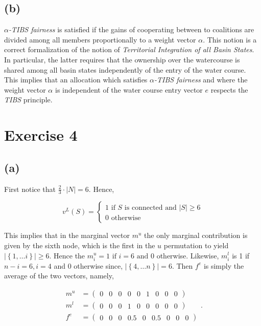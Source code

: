 \documentclass[american]{scrartcl}
\newcommand{\set}[1]{\left\{#1\right\}}
\newcommand{\abs}[1]{\left\lvert #1 \right\rvert}
\begin{document}
\subsection*{(b)}

$\alpha$\textit{-TIBS fairness} is satisfied if the gains of cooperating between to coalitions are divided among all members proportionally to a weight vector $\alpha$. This notion is a correct formalization of the notion of \textit{Territorial Integration of all Basin States}. In particular, the latter requires that the ownership over the watercourse is shared among all basin states independently of the entry of the water course. This implies that an allocation which satisfies $\alpha$\textit{-TIBS fairness} and where the weight vector $\alpha$ is independent of the water course entry vector $e$ respects the \textit{TIBS} principle.



\section*{Exercise 4}

\subsection*{(a)}

First notice that $\frac{2}{3} \cdot \abs{N} = 6$. Hence,

\begin{equation}
    v^L(S) = \begin{cases}
        1  \text{ if $S$ is connected and } \abs{S} \geq 6 \\
        0 \text{ otherwise }
    \end{cases}
\end{equation}


This implies that in the marginal vector $m^u$ the only marginal contribution is given by the sixth node, which is the first in the $u$ permutation to yield $\abs{\set{1, \dots i}} \geq 6$. Hence the $m^u_i = 1 \text{ if } i = 6 \text{ and } 0$ otherwise. Likewise, $m^l_i$ is 1 if $n - i = 6, i = 4$ and $0$ otherwise since, $\abs{\set{4, \dots n}} = 6$. Then $f^e$ is simply the average of the two vectors, namely,

\begin{equation}
    \begin{split}
        m^u &= \begin{pmatrix} 0 &0 &0 &0 &0 &1 &0 &0 &0 \end{pmatrix} \\
        m^l &= \begin{pmatrix} 0 &0 &0 &1 &0 &0 &0 &0 &0 \end{pmatrix} \\
        f^e &= \begin{pmatrix} 0 &0 &0 &0.5 &0 &0.5 &0 &0 &0 \end{pmatrix}
    \end{split}.
\end{equation}
\end{document}
